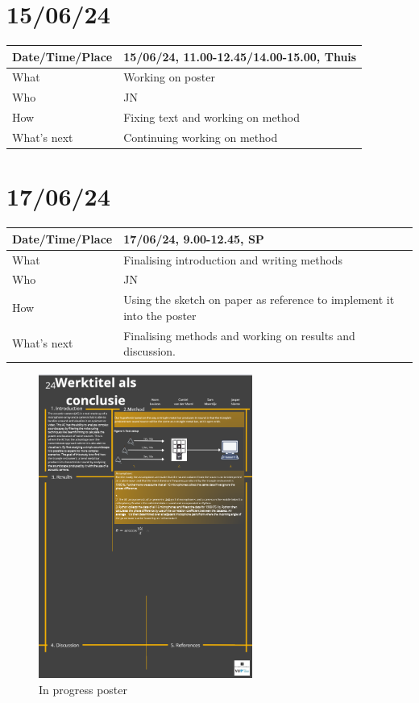 \documentclass{article}
\begin{document}
\section{15/06/24}

\begin{table}[H]
\begin{tabular}{|p{1.5in}|p{4in}|}
\hline
Date/Time/Place & 15/06/24, 11.00-12.45/14.00-15.00, Thuis \\ \hline
What            & Working on poster \\ \hline
Who             & JN \\ \hline
How             & Fixing text and working on method \\ \hline
What's next     & Continuing working on method \\ \hline
\end{tabular}
\end{table}

\section{17/06/24}

\begin{table}[H]
\begin{tabular}{|p{1.5in}|p{4in}|}
\hline
Date/Time/Place & 17/06/24, 9.00-12.45, SP \\ \hline
What            & Finalising introduction and writing methods \\ \hline
Who             & JN \\ \hline
How             & Using the sketch on paper as reference to implement it into the poster \\ \hline
What's next     & Finalising methods and working on results and discussion. \\ \hline
\end{tabular}
\end{table}

\begin{figure}[H]
    \centering
    \includegraphics[width=7cm]{inprogressposterV2.png}
    \caption{In progress poster}   
\end{figure}
\end{document}
